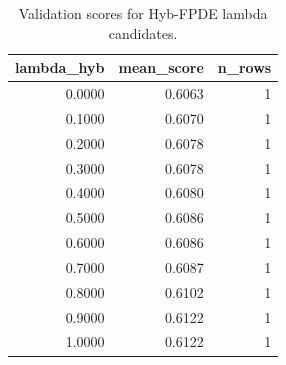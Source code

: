 \begin{table}[t]
\caption{Validation scores for Hyb-FPDE lambda candidates.}
\label{tab:lambda_distribution_computed}
\centering
\begin{tabular}{rrr}
\toprule
lambda\_hyb & mean\_score & n\_rows \\
\midrule
0.0000 & 0.6063 & 1 \\
0.1000 & 0.6070 & 1 \\
0.2000 & 0.6078 & 1 \\
0.3000 & 0.6078 & 1 \\
0.4000 & 0.6080 & 1 \\
0.5000 & 0.6086 & 1 \\
0.6000 & 0.6086 & 1 \\
0.7000 & 0.6087 & 1 \\
0.8000 & 0.6102 & 1 \\
0.9000 & 0.6122 & 1 \\
1.0000 & 0.6122 & 1 \\
\bottomrule
\end{tabular}

\end{table}
